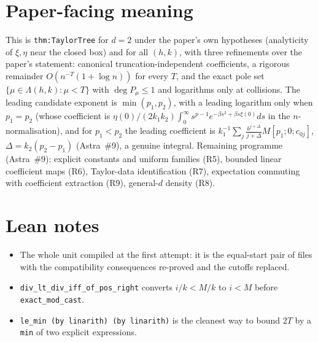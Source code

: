 \documentclass[11pt]{article}
\begin{document}
\section{Paper-facing meaning}

This is \texttt{thm:TaylorTree} for $d=2$ under the paper's own hypotheses (analyticity of
$\xi,\eta$ near the closed box) and for all $(h,k)$, with three refinements over the paper's
statement: canonical truncation-independent coefficients, a rigorous remainder
$O(n^{-T}(1+\log n))$ for every $T$, and the exact pole set $\{\mu\in\Lambda(h,k):\mu<T\}$ with
$\deg P_\mu\le1$ and logarithms only at collisions. The leading candidate exponent is $\min(p_1,p_2)$,
with a leading logarithm only when $p_1=p_2$ (whose coefficient is
$\eta(0)/(2k_1k_2)\int_0^\infty s^{p-1}e^{-\beta s^2+\beta s\xi(0)}ds$ in the $n$-normalisation), and for
$p_1<p_2$ the leading coefficient is $k_1^{-1}\sum_j\frac{b^{j+\Delta}}{j+\Delta}M[p_1;0;c_{0j}]$,
$\Delta=k_2(p_2-p_1)$ (Astra~\#9), a genuine integral. Remaining programme (Astra~\#9): explicit
constants and uniform families (R5), bounded linear coefficient maps (R6), Taylor-data
identification (R7), expectation commuting with coefficient extraction (R9), general-$d$ density (R8).

\section{Lean notes}

\begin{itemize}
\item The whole unit compiled at the first attempt: it is the equal-start pair of files with the
compatibility consequences re-proved and the cutoffs replaced.
\item \texttt{div\_lt\_div\_iff\_of\_pos\_right} converts $i/k<M/k$ to $i<M$ before
\texttt{exact\_mod\_cast}.
\item \texttt{le\_min (by linarith) (by linarith)} is the cleanest way to bound $2T$ by a
\texttt{min} of two explicit expressions.
\end{itemize}
\end{document}
